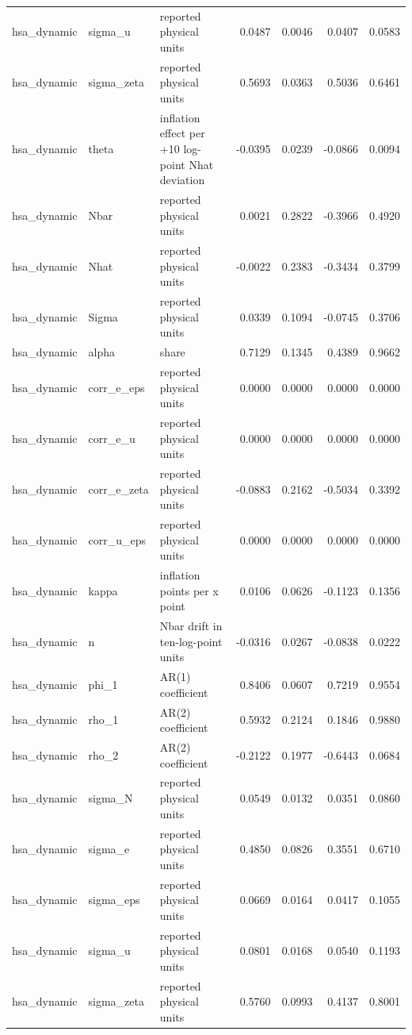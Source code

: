 \begin{tabular}{lllrrrr}
hsa\_dynamic & sigma\_u & reported physical units & 0.0487 & 0.0046 & 0.0407 & 0.0583 \\
hsa\_dynamic & sigma\_zeta & reported physical units & 0.5693 & 0.0363 & 0.5036 & 0.6461 \\
hsa\_dynamic & theta & inflation effect per +10 log-point Nhat deviation & -0.0395 & 0.0239 & -0.0866 & 0.0094 \\
hsa\_dynamic & Nbar & reported physical units & 0.0021 & 0.2822 & -0.3966 & 0.4920 \\
hsa\_dynamic & Nhat & reported physical units & -0.0022 & 0.2383 & -0.3434 & 0.3799 \\
hsa\_dynamic & Sigma & reported physical units & 0.0339 & 0.1094 & -0.0745 & 0.3706 \\
hsa\_dynamic & alpha & share & 0.7129 & 0.1345 & 0.4389 & 0.9662 \\
hsa\_dynamic & corr\_e\_eps & reported physical units & 0.0000 & 0.0000 & 0.0000 & 0.0000 \\
hsa\_dynamic & corr\_e\_u & reported physical units & 0.0000 & 0.0000 & 0.0000 & 0.0000 \\
hsa\_dynamic & corr\_e\_zeta & reported physical units & -0.0883 & 0.2162 & -0.5034 & 0.3392 \\
hsa\_dynamic & corr\_u\_eps & reported physical units & 0.0000 & 0.0000 & 0.0000 & 0.0000 \\
hsa\_dynamic & kappa & inflation points per x point & 0.0106 & 0.0626 & -0.1123 & 0.1356 \\
hsa\_dynamic & n & Nbar drift in ten-log-point units & -0.0316 & 0.0267 & -0.0838 & 0.0222 \\
hsa\_dynamic & phi\_1 & AR(1) coefficient & 0.8406 & 0.0607 & 0.7219 & 0.9554 \\
hsa\_dynamic & rho\_1 & AR(2) coefficient & 0.5932 & 0.2124 & 0.1846 & 0.9880 \\
hsa\_dynamic & rho\_2 & AR(2) coefficient & -0.2122 & 0.1977 & -0.6443 & 0.0684 \\
hsa\_dynamic & sigma\_N & reported physical units & 0.0549 & 0.0132 & 0.0351 & 0.0860 \\
hsa\_dynamic & sigma\_e & reported physical units & 0.4850 & 0.0826 & 0.3551 & 0.6710 \\
hsa\_dynamic & sigma\_eps & reported physical units & 0.0669 & 0.0164 & 0.0417 & 0.1055 \\
hsa\_dynamic & sigma\_u & reported physical units & 0.0801 & 0.0168 & 0.0540 & 0.1193 \\
hsa\_dynamic & sigma\_zeta & reported physical units & 0.5760 & 0.0993 & 0.4137 & 0.8001 \\

\end{tabular}
